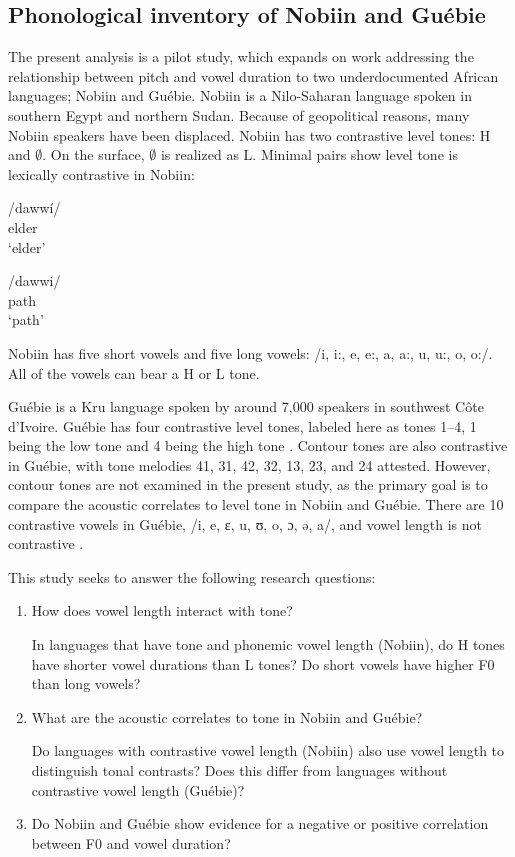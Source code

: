 \documentclass[output=paper]{langscibook}
\begin{document}
\subsection{Phonological inventory of Nobiin and Guébie}
The present analysis is a pilot study, which expands on work addressing the relationship between pitch and vowel duration to two underdocumented African languages; Nobiin and Guébie. Nobiin is a Nilo-Saharan language spoken in southern Egypt and northern Sudan. Because of geopolitical reasons, many Nobiin speakers have been displaced. Nobiin has two contrastive level tones: H and $\emptyset$. On the surface, $\emptyset$ is realized as L. Minimal pairs show level tone is lexically contrastive in Nobiin: 


\ea \label{ex:oakley:NobiinContrastiveTone}
\begin{xlist}

\ex \label{ex:oakley:NobiinElder}
\gll /daww\'i/ \\
elder \\
\glt `elder' 

\ex \label{ex:oakley:NobiinPath}
\gll /dawwi/ \\
path \\
\glt `path' 

\end{xlist}

\z 



Nobiin has five short vowels and five long vowels: /i, i:, e, e:, a, a:, u, u:, o, o:/. All of the vowels can bear a H or L tone.

Guébie is a Kru language spoken by around 7,000 speakers in southwest C\^ote d'Ivoire. Guébie has four contrastive level tones, labeled here as tones 1--4, 1 being the low tone and 4 being the high tone \citep{sande2017}. Contour tones are also contrastive in Guébie, with tone melodies 41, 31, 42, 32, 13, 23, and 24 attested. However, contour tones are not examined in the present study, as the primary goal is to compare the acoustic correlates to level tone in Nobiin and Guébie. There are 10 contrastive vowels in Guébie, /i, e, ɛ, u, ʊ, o, ɔ, ə, a/, and vowel length is not contrastive \citep{sande2017}.


This study seeks to answer the following research questions:
\begin{enumerate}
\item How does vowel length interact with tone? 

In languages that have tone and phonemic vowel length (Nobiin), do H tones have shorter vowel durations than L tones? Do short vowels have higher F0 than long vowels?

\item What are the acoustic correlates to tone in Nobiin and Guébie?

Do languages with contrastive vowel length (Nobiin) also use vowel length to distinguish tonal contrasts? Does this differ from languages without contrastive vowel length (Guébie)?

\item Do Nobiin and Guébie show evidence for a negative or positive correlation between F0 and vowel duration?
\end{enumerate}
\end{document}
